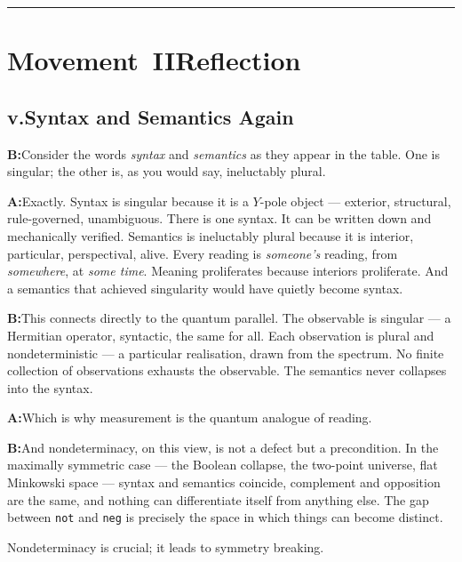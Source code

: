 \documentclass[11pt]{article}
\newcommand{\A}{\medskip\noindent\textbf{A:}\quad}
\newcommand{\B}{\medskip\noindent\textbf{B:}\quad}
\begin{document}
\bigskip\rule{\textwidth}{0.4pt}\bigskip

\section*{Movement~II\quad Reflection}

\subsection*{v.\enspace Syntax and Semantics Again}

\B Consider the words \textit{syntax} and \textit{semantics} as they
appear in the table. One is singular; the other is, as you would say,
ineluctably plural.

\A Exactly. Syntax is singular because it is a $Y$-pole object ---
exterior, structural, rule-governed, unambiguous. There is one syntax.
It can be written down and mechanically verified. Semantics is
ineluctably plural because it is interior, particular, perspectival,
alive. Every reading is \emph{someone's} reading, from \emph{somewhere},
at \emph{some time}. Meaning proliferates because interiors
proliferate. And a semantics that achieved singularity would have
quietly become syntax.

\B This connects directly to the quantum parallel. The observable is
singular --- a Hermitian operator, syntactic, the same for all. Each
observation is plural and nondeterministic --- a particular realisation,
drawn from the spectrum. No finite collection of observations exhausts
the observable. The semantics never collapses into the syntax.

\A Which is why measurement is the quantum analogue of reading.

\B And nondeterminacy, on this view, is not a defect but a
precondition. In the maximally symmetric case --- the Boolean
collapse, the two-point universe, flat Minkowski space --- syntax and
semantics coincide, complement and opposition are the same, and
nothing can differentiate itself from anything else. The gap between
\texttt{not} and \texttt{neg} is precisely the space in which
things can become distinct.

\begin{pearl}
Nondeterminacy is crucial; it leads to symmetry breaking.
\end{pearl}
\end{document}
